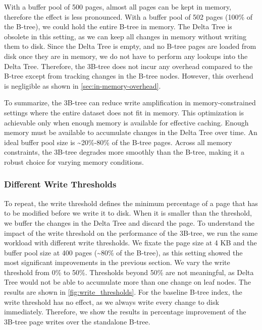 With a buffer pool of 500 pages, almost all pages can be kept in memory, therefore the effect is less pronounced.
With a buffer pool of 502 pages (100\% of the B-tree), we could hold the entire B-tree in memory.
The Delta Tree is obsolete in this setting, as we can keep all changes in memory without writing them to disk.
Since the Delta Tree is empty, and no B-tree pages are loaded from disk once they are in memory, we do not have to perform any lookups into the Delta Tree.
Therefore, the 3B-tree does not incur any overhead compared to the B-tree except from tracking changes in the B-tree nodes.
However, this overhead is negligible as shown in \autoref{sec:in-memory-overhead}.

To summarize, the 3B-tree can reduce write amplification in memory-constrained settings where the entire dataset does not fit in memory.
This optimization is achievable only when enough memory is available for effective caching.
Enough memory must be available to accumulate changes in the Delta Tree over time.
An ideal buffer pool size is \textasciitilde20\%-80\% of the B-tree pages.
Across all memory constraints, the 3B-tree degrades more smoothly than the B-tree, making it a robust choice for varying memory conditions.

\subsubsection*{Different Write Thresholds}
\label{sec:different-write-thresholds}
To repeat, the write threshold defines the minimum percentage of a page that has to be modified before we write it to disk.
When it is smaller than the threshold, we buffer the changes in the Delta Tree and discard the page.
To understand the impact of the write threshold on the performance of the 3B-tree, we run the same workload with different write thresholds.
We fixate the page size at 4 KB and the buffer pool size at 400 pages (\textasciitilde80\% of the B-tree), as this setting showed the most significant improvements in the previous section.
We vary the write threshold from 0\% to 50\%.
Thresholds beyond 50\% are not meaningful, as Delta Tree would not be able to accumulate more than one change on leaf nodes.
The results are shown in \autoref{fig:write_thresholds}.
For the baseline B-tree index, the write threshold has no effect, as we always write every change to disk immediately.
Therefore, we show the results in percentage improvement of the 3B-tree page writes over the standalone B-tree.

